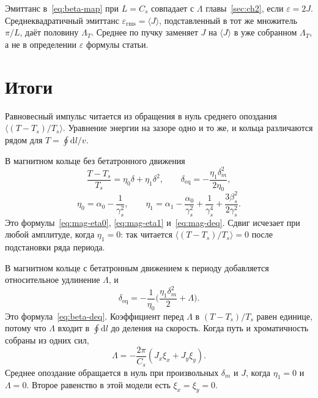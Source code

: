 \documentclass[aps,pra,preprint,a4paper,amsmath,amssymb,longbibliography]{revtex4-2}
\begin{document}
Эмиттанс в~\eqref{eq:beta-map} при $L=C_s$ совпадает с $\Lambda$ главы~\ref{sec:ch2}, если $\varepsilon=2J$. Среднеквадратичный эмиттанс $\varepsilon_{\mathrm{rms}}=\langle J\rangle$, подставленный в тот же множитель $\pi/L$, даёт половину $\Lambda_T$. Среднее по пучку заменяет $J$ на $\langle J\rangle$ в уже собранном $\Lambda_T$, а не в определении $\varepsilon$ формулы статьи.

\section{Итоги}
\label{sec:summary}

Равновесный импульс читается из обращения в нуль среднего опоздания $\langle(T-T_s)/T_s\rangle$. Уравнение энергии на зазоре одно и то же, и кольца различаются рядом для $T=\oint\mathrm{d}l/v$.

В магнитном кольце без бетатронного движения
\begin{equation*}
\frac{T-T_s}{T_s}=\eta_0\delta+\eta_1\delta^2,
\qquad
\delta_{\mathrm{eq}}=-\frac{\eta_1\delta_m^2}{2\eta_0},
\end{equation*}
\begin{equation*}
\eta_0=\alpha_0-\frac{1}{\gamma_s^2},
\qquad
\eta_1=\alpha_1-\frac{\alpha_0}{\gamma_s^2}+\frac{1}{\gamma_s^4}+\frac{3\beta_s^2}{2\gamma_s^2}.
\end{equation*}
Это формулы~\eqref{eq:mag-eta0}, \eqref{eq:mag-eta1} и~\eqref{eq:mag-deq}. Сдвиг исчезает при любой амплитуде, когда $\eta_1=0$: так читается $\langle(T-T_s)/T_s\rangle=0$ после подстановки ряда периода.

В магнитном кольце с бетатронным движением к периоду добавляется относительное удлинение $\Lambda$, и
\begin{equation*}
\delta_{\mathrm{eq}}=-\frac{1}{\eta_0}\Biggl(\frac{\eta_1\delta_m^2}{2}+\Lambda\Biggr).
\end{equation*}
Это формула~\eqref{eq:beta-deq}. Коэффициент перед $\Lambda$ в $(T-T_s)/T_s$ равен единице, потому что $\Lambda$ входит в $\oint\mathrm{d}l$ до деления на скорость. Когда путь и хроматичность собраны из одних сил,
\begin{equation*}
\Lambda=-\frac{2\pi}{C_s}(J_x\xi_x+J_y\xi_y).
\end{equation*}
Среднее опоздание обращается в нуль при произвольных $\delta_m$ и $J$, когда $\eta_1=0$ и $\Lambda=0$. Второе равенство в этой модели есть $\xi_x=\xi_y=0$.
\end{document}
